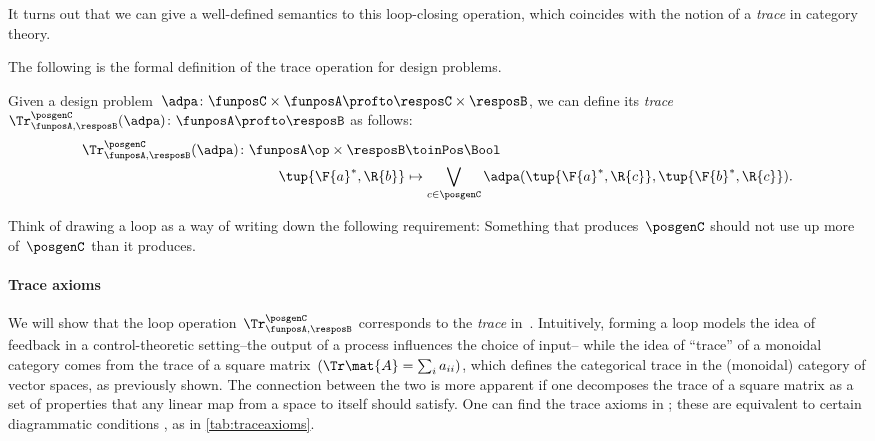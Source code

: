 It turns out that we can give a well-defined semantics to this loop-closing operation, which coincides with the notion of a \emph{trace} in category theory.

The following is the formal definition of the trace operation for design problems.


\begin{definition}
    \label{def:dp-trace}
    Given a design problem~$\adpa\colon \funposC \times \funposA \profto \resposC \times \resposB$, we can define
    its \emph{trace}~$\Tr_{\funposA,\resposB}^\posgenC(\adpa) \colon \funposA \profto \resposB$ as follows:
%
    \begin{equation}
        \label{eq:tracedef}
        \begin{aligned}
            \Tr_{\funposA,\resposB}^\posgenC(\adpa) \colon  \funposA\op \times \resposB &\toinPos \Bool \\
            \tup{\F{a}^*, \R{b}} &\mapsto \bigvee_{c\in \posgenC}
            \adpa(\tup{\F{a}^*, \R{c}},
            \tup{\F{b}^*, \R{c}}).
        \end{aligned}
    \end{equation}
\end{definition}


Think of drawing a loop as a way of writing down the following requirement: Something that produces~$\posgenC$ should not use up more of~$\posgenC$ than it produces.


\paragraph{Trace axioms}
We will show that the loop operation~$\Tr_{\funposA,\resposB}^\posgenC$ corresponds to the \emph{trace} in~\DP.
Intuitively, forming a loop models the idea of feedback in a control-theoretic setting--the output of a process influences the choice of input--
while the idea of ``trace'' of a monoidal category comes from the trace of a square matrix~$(\Tr\mat{A} = \sum_i a_{ii})$, which defines the categorical trace in the (monoidal) category of vector spaces, as previously shown.
The connection between the two is more apparent if one decomposes the trace of a square matrix as a set of properties that any linear map from a space to itself should satisfy. One can find the trace axioms in  \cite{mac2013categories};
these are equivalent to certain diagrammatic conditions \cite{joyal96}, as in \cref{tab:traceaxioms}.


